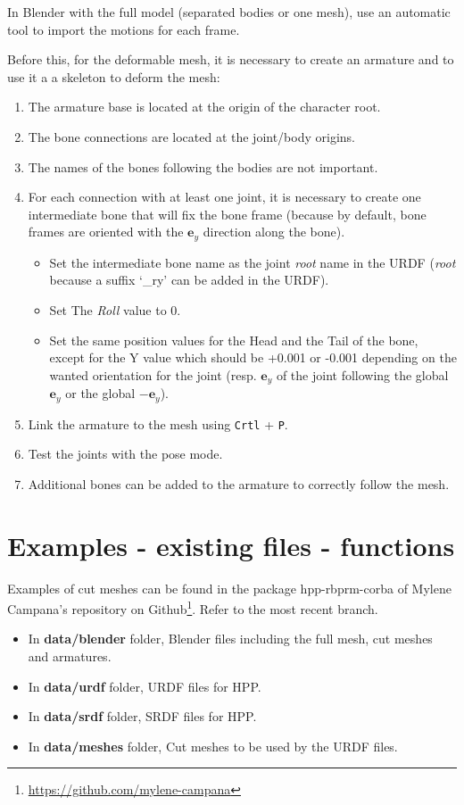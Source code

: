 \documentclass[12pt]{article}
\newcommand\e{\mathbf{e}}
\begin{document}
In Blender with the full model (separated bodies or one mesh), use an automatic tool to import the motions for each frame.

Before this, for the deformable mesh, it is necessary to create an armature and to use it a a skeleton to deform the mesh:
\begin{enumerate}
	\item The armature base is located at the origin of the character root.
	\item The bone connections are located at the joint/body origins.
	\item The names of the bones following the bodies are not important.
	\item For each connection with at least one joint, it is necessary to create one intermediate bone that will fix the bone frame (because by default, bone frames are oriented with the $\e_y$ direction along the bone).
	\begin{itemize}
		\item Set the intermediate bone name as the joint \textit{root} name in the URDF (\textit{root} because a suffix `\_ry' can be added in the URDF).
		\item Set The \textit{Roll} value to 0.
		\item Set the same position values for the Head and the Tail of the bone, except for the Y value which should be +0.001 or -0.001 depending on the wanted orientation for the joint (resp. $\e_y$ of the joint following the global $\e_y$ or the global $-\e_y$).
	\end{itemize}
	\item Link the armature to the mesh using \texttt{Crtl} + \texttt{P}.
	\item Test the joints with the pose mode.
	\item Additional bones can be added to the armature to correctly follow the mesh.
\end{enumerate}



\section{Examples - existing files - functions}

Examples of cut meshes can be found in the package hpp-rbprm-corba of Mylene Campana's repository on Github\footnote{\url{https://github.com/mylene-campana}}. Refer to the most recent branch.
\begin{itemize}
	\item In \textbf{data/blender} folder, Blender files including the full mesh, cut meshes and armatures.
	\item In \textbf{data/urdf} folder, URDF files for HPP.
	\item In \textbf{data/srdf} folder, SRDF files for HPP.
	\item In \textbf{data/meshes} folder, Cut meshes to be used by the URDF files.
\end{itemize}
\end{document}
